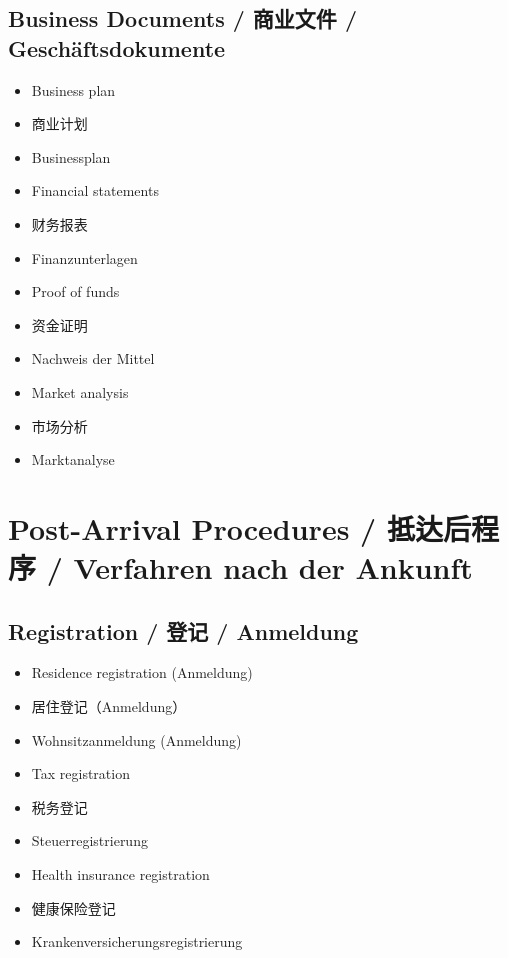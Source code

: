 \subsection{Business Documents / 商业文件 / Geschäftsdokumente}
\begin{itemize}
    \item Business plan
    \item 商业计划
    \item Businessplan
    \item Financial statements
    \item 财务报表
    \item Finanzunterlagen
    \item Proof of funds
    \item 资金证明
    \item Nachweis der Mittel
    \item Market analysis
    \item 市场分析
    \item Marktanalyse
\end{itemize}

\section{Post-Arrival Procedures / 抵达后程序 / Verfahren nach der Ankunft}

\subsection{Registration / 登记 / Anmeldung}
\begin{itemize}
    \item Residence registration (Anmeldung)
    \item 居住登记（Anmeldung）
    \item Wohnsitzanmeldung (Anmeldung)
    \item Tax registration
    \item 税务登记
    \item Steuerregistrierung
    \item Health insurance registration
    \item 健康保险登记
    \item Krankenversicherungsregistrierung
\end{itemize}

